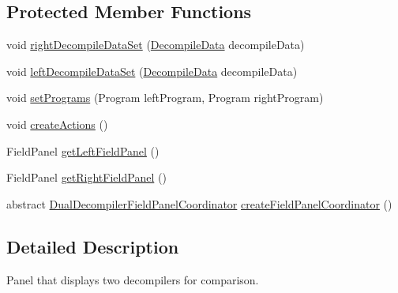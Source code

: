 \subsection*{Protected Member Functions}
\begin{DoxyCompactItemize}
\item 
void \mbox{\hyperlink{classghidra_1_1app_1_1decompiler_1_1component_1_1_decompiler_code_comparison_panel_a0a0904fa33b0884b6f1cf69ab1477f7c}{right\+Decompile\+Data\+Set}} (\mbox{\hyperlink{classghidra_1_1app_1_1decompiler_1_1component_1_1_decompile_data}{Decompile\+Data}} decompile\+Data)
\item 
void \mbox{\hyperlink{classghidra_1_1app_1_1decompiler_1_1component_1_1_decompiler_code_comparison_panel_ab419ff195f6626a7449243d3410faf04}{left\+Decompile\+Data\+Set}} (\mbox{\hyperlink{classghidra_1_1app_1_1decompiler_1_1component_1_1_decompile_data}{Decompile\+Data}} decompile\+Data)
\item 
void \mbox{\hyperlink{classghidra_1_1app_1_1decompiler_1_1component_1_1_decompiler_code_comparison_panel_a470a68e065fb8b87a90e29d5b54f69d2}{set\+Programs}} (Program left\+Program, Program right\+Program)
\item 
void \mbox{\hyperlink{classghidra_1_1app_1_1decompiler_1_1component_1_1_decompiler_code_comparison_panel_ab432bffacd254507f3ba41171bcdd664}{create\+Actions}} ()
\item 
Field\+Panel \mbox{\hyperlink{classghidra_1_1app_1_1decompiler_1_1component_1_1_decompiler_code_comparison_panel_ac9ef9d76d21e9144f46b162b958589a9}{get\+Left\+Field\+Panel}} ()
\item 
Field\+Panel \mbox{\hyperlink{classghidra_1_1app_1_1decompiler_1_1component_1_1_decompiler_code_comparison_panel_ad9b4c26a0b9ac5d33359777f3bc8bd51}{get\+Right\+Field\+Panel}} ()
\item 
abstract \mbox{\hyperlink{classghidra_1_1app_1_1decompiler_1_1component_1_1_dual_decompiler_field_panel_coordinator}{Dual\+Decompiler\+Field\+Panel\+Coordinator}} \mbox{\hyperlink{classghidra_1_1app_1_1decompiler_1_1component_1_1_decompiler_code_comparison_panel_aa9b0f843d7093f711bad38b68abf3d19}{create\+Field\+Panel\+Coordinator}} ()
\end{DoxyCompactItemize}


\subsection{Detailed Description}
Panel that displays two decompilers for comparison. 

